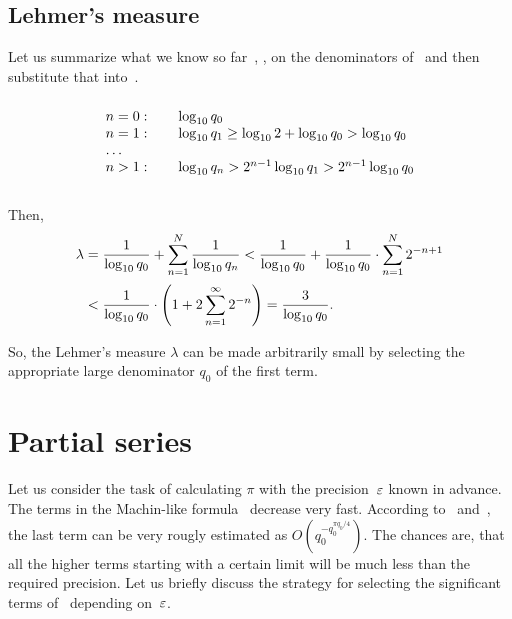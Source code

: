 \documentclass[draft, 10pt]{article} %
\begin{document}
\subsection{Lehmer's measure}

Let us summarize what we know so far~,
, on the denominators of~
and then substitute that into~.
\begin{equation}\mlabel{next-log}\vcenter{\hbox to 10em{\hss\vbox{
\begin{center}
\begin{tabular}{ l l }
$n=0:\quad$ & $\lg q_0$ \\
$n=1:$ & $\lg q_1 \ge \lg 2 + \lg q_0 > \lg q_0$ \\
$\dots$ \\
$n>1:$ & $\lg q_n > 2^{n-1} \lg q_1 > 2^{n-1} \lg q_0$ \\
\end{tabular}
\end{center}%
}\hss}}\end{equation}

Then,
%
\begin{equation}\mlabel{lehmer-switch}
\begin{array}{l}
\lambda = \dfrac{1}{\lg q_0} + \ds\sum_{n=1}^N \dfrac{1}{\lg q_n}
    < \dfrac{1}{\lg q_0} + \dfrac{1}{\lg q_0} \cdot \ds\sum_{n=1}^N 2^{-n+1} \\[1.5em]
\phantom{\lambda} < \dfrac{1}{\lg q_0} \cdot \left( 1 + 2\ds\sum_{n=1}^\infty 2^{-n} \right)
    = \dfrac{3}{\lg q_0}.
\end{array}
\end{equation}

So, the Lehmer's measure $\lambda$ can be made arbitrarily small by selecting
the appropriate large denominator $q_0$ of the first term.

\section{Partial series}

Let us consider the task of calculating $\pi$ with the precision~$\varepsilon$ known in advance.
The terms in the Machin-like formula~ decrease very fast.
According to~ and~, the last term
can be very rougly estimated as $O(q_0^{-q_0^{\pi q_0/4}})$.
The chances are, that all the higher terms starting with a certain limit will be much less
than the required precision. Let us briefly discuss the strategy for selecting
the significant terms of~ depending on~$\varepsilon$.
\end{document}
